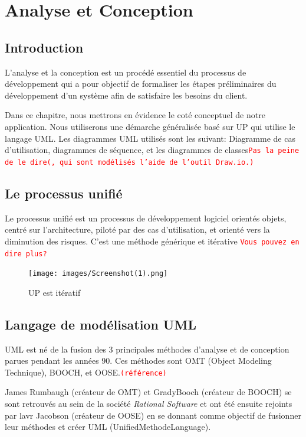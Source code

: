 \documentclass[french]{report}
\newcommand\rmq[1]{\textcolor{red}{\tt #1}}
\begin{document}

\chapter{Analyse et Conception}

\section{Introduction}

L'analyse et la conception est un procédé essentiel du processus de
développement qui a pour objectif de formaliser les étapes préliminaires du
développement d'un système afin de satisfaire les besoins du client.

Dans ce chapitre, nous mettrons en évidence le coté conceptuel de notre
application. Nous utiliserons une démarche généralisée basé sur UP qui utilise
le langage UML. Les diagrammes UML utilisés sont les suivant: Diagramme de cas
d'utilisation, diagrammes de séquence, et les diagrammes de classes\rmq{Pas la
peine de le dire(, qui sont modélisés l'aide de l'outil Draw.io.)}

\section{Le processus unifié}

Le processus unifié est un processus de développement logiciel orientés objets,
centré sur l'architecture, piloté par des cas d'utilisation, et orienté vers la
diminution des risques. C'est une méthode générique et itérative \cite{UP}
\rmq{Vous pouvez en dire plus?}

\begin{figure}[h] 
    \center 
    \texttt{[image: images/Screenshot(1).png]} 
    \caption{UP est itératif}
\end{figure}

\section{Langage de modélisation UML}

UML est né de la fusion des 3 principales méthodes d'analyse et de conception
parues pendant les années 90. Ces méthodes sont OMT (Object Modeling Technique),
BOOCH, et OOSE.\rmq{(référence)}

James Rumbaugh (créateur de OMT) et GradyBooch (créateur de BOOCH) se sont
retrouvés au sein de la société \emph{Rational Software} et ont été ensuite
rejoints par lavr Jacobson (créateur de OOSE) en se donnant comme objectif de
fusionner leur méthodes et créer UML (UnifiedMethodeLanguage).
\end{document}
